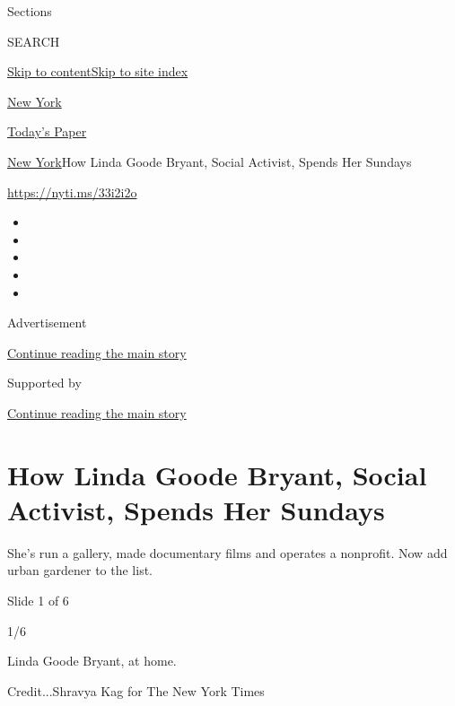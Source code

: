 Sections

SEARCH

\protect\hyperlink{site-content}{Skip to
content}\protect\hyperlink{site-index}{Skip to site index}

\href{https://www.nytimes.com/section/nyregion}{New York}

\href{https://myaccount.nytimes.com/auth/login?response_type=cookie\&client_id=vi}{}

\href{https://www.nytimes.com/section/todayspaper}{Today's Paper}

\href{/section/nyregion}{New York}\textbar{}How Linda Goode Bryant,
Social Activist, Spends Her Sundays

\href{https://nyti.ms/33i2i2o}{https://nyti.ms/33i2i2o}

\begin{itemize}
\item
\item
\item
\item
\item
\end{itemize}

Advertisement

\protect\hyperlink{after-top}{Continue reading the main story}

Supported by

\protect\hyperlink{after-sponsor}{Continue reading the main story}

\hypertarget{how-linda-goode-bryant-social-activist-spends-her-sundays}{%
\section{How Linda Goode Bryant, Social Activist, Spends Her
Sundays}\label{how-linda-goode-bryant-social-activist-spends-her-sundays}}

She's run a gallery, made documentary films and operates a nonprofit.
Now add urban gardener to the list.

Slide 1 of 6

1/6

Linda Goode Bryant, at home.

Credit...Shravya Kag for The New York Times

